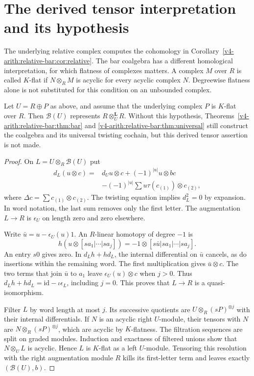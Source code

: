 \section{The derived tensor interpretation and its hypothesis}

The underlying relative complex computes the cohomology in
Corollary~\ref{v4-arith:relative-bar:cor:relative}. The bar coalgebra has a different
homological interpretation, for which flatness of complexes matters.
A complex $M$ over $R$ is called $K$-flat if $N\otimes_R M$ is
acyclic for every acyclic complex $N$. Degreewise flatness alone is
not substituted for this condition on an unbounded complex.

\begin{theorem}\label{v4-arith:relative-bar:thm:tor}
Let $U=R\oplus P$ as above, and assume that the underlying complex
$P$ is $K$-flat over $R$. Then $\mathcal{B}(U)$ represents
$R\otimes_U^{\mathbf L}R$.
Without this hypothesis, Theorems~\ref{v4-arith:relative-bar:thm:bar} and
\ref{v4-arith:relative-bar:thm:universal} still construct the coalgebra and its universal
twisting cochain, but this derived tensor assertion is not made.
\end{theorem}
\begin{proof}
On $L=U\otimes_R\mathcal{B}(U)$ put
\begin{align*}
 d_L(u\otimes c)={}&d_Uu\otimes c+(-1)^{|u|}u\otimes bc\\
 &-(-1)^{|u|}\sum u\tau(c_{(1)})\otimes c_{(2)},
\end{align*}
where $\Delta c=\sum c_{(1)}\otimes c_{(2)}$. The twisting equation
implies $d_L^2=0$ by expansion. In word notation, the last sum removes
only the first letter. The augmentation $L\to R$ is $\epsilon_U$ on
length zero and zero elsewhere.

Write $\bar u=u-\epsilon_U(u)1$. An $R$-linear homotopy of degree
$-1$ is
\[
 h(u\otimes[sa_1|\cdots|sa_j])
 =-1\otimes[s\bar u|sa_1|\cdots|sa_j].
\]
An entry $s0$ gives zero. In $d_Lh+hd_L$, the internal differential
on $\bar u$ cancels, as do insertions within the remaining word.
The first multiplication gives $\bar u\otimes c$. The two terms
that join $\bar u$ to $a_1$ leave $\epsilon_U(u)\otimes c$ when
$j>0$. Thus $d_Lh+hd_L=\mathrm{id}-\iota\epsilon_L$, including $j=0$.
This proves that $L\to R$ is a quasi-isomorphism.

Filter $L$ by word length at most $j$. Its successive quotients are
$U\otimes_R(sP)^{\otimes j}$ with their internal differentials.
If $N$ is an acyclic right $U$-module, their tensors with $N$ are
$N\otimes_R(sP)^{\otimes j}$, which are acyclic by $K$-flatness.
The filtration sequences are split on graded modules. Induction and
exactness of filtered unions show that $N\otimes_U L$ is acyclic.
Hence $L$ is $K$-flat as a left $U$-module. Tensoring this resolution
with the right augmentation module $R$ kills its first-letter term
and leaves exactly $(\mathcal{B}(U),b)$.
\end{proof}

